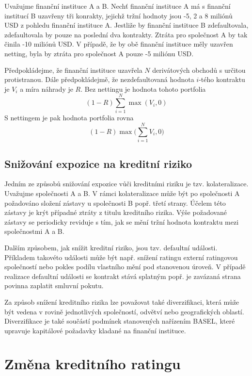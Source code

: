 \documentclass[a4paper]{book}
\begin{document}
Uvažujme finanční instituce A a B. Nechť finanční instituce A má s finanční institucí B uzavřeny tři konrakty, jejichž tržní hodnoty jsou -5, 2 a 8 miliónů USD z pohledu finanční instituce A. Jestliže by finanční instituce B zdefaultovala, zdefaultovala by pouze na poslední dva kontrakty. Ztráta pro společnost A by tak činila -10 miliónů USD. V případě, že by obě finanční instituce měly uzavřen netting, byla by ztráta pro společnost A pouze -5 miliónu USD.

Předpokládejme, že finanční instituce uzavřela $N$ derivátových obchodů s určitou protistranou. Dále předpokládejmě, že nezdefaultovaná hodnota $i$-tého kontraktu je $V_i$ a míra náhrady je $R$. Bez nettingu je hodnota tohoto portfolia 
\begin{equation*}
(1-R)\sum^N_{i=1}\max(V_i,0)
\end{equation*}
S nettingem je pak hodnota portfolia rovna
\begin{equation*}
(1-R)\max \Big(\sum^N_{i=1}V_i,0 \Big)
\end{equation*}

\subsection{Snižování expozice na kreditní riziko}

Jedním ze způsobů snižování expozice vůči kreditními riziku je tzv. kolateralizace. Uvažujme společnosti A a B. V rámci kolateralizace může být po společnosti A požadováno složení zástavy u společnosti B popř. třetí strany. Účelem této zástavy je krýt případné ztráty z titulu kreditního rizika. Výše požadované zástavy se periodicky reviduje s tím, jak se mění tržní hodnota kontraktu mezi společnostmi A a B.

Dalším způsobem, jak snížit kreditní riziko, jsou tzv. defaultní události. Příkladem takovéto události může být např. snížení ratingu externí ratingovou společností nebo pokles podílu vlastního mění pod stanovenou úroveň. V případě realizace defaultní události se kontrakt stává splatným popř. je zavázaná strana povinna zaplatit smluvní pokutu.

Za způsob snížení kreditního rizika lze považovat také diverzifikaci, která může být vedena v rovině jednotlivých společností, odvětví nebo geografických oblastí. Diverzifikace je také součástí podmínek stanovených nařízením BASEL, které upravuje kapitálové požadavky kladané na finanční instituce.

\section{Změna kreditního ratingu}
\end{document}
